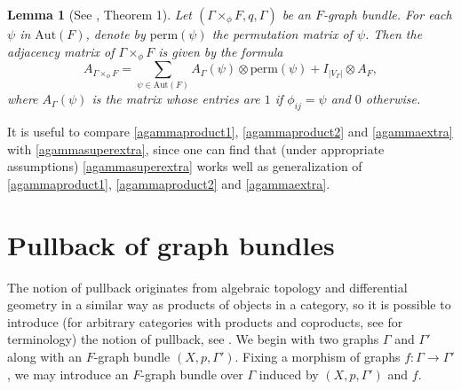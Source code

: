 \documentclass{amsart}
\newtheorem{lem}[theo]{Lemma}
\theoremstyle{definition}
\numberwithin{equation}{section}
\begin{document}
\begin{lem}[See \cite{kwakk}, Theorem 1]\label{th.kwakk}
Let $(\Gamma \times_{\phi} F, q, \Gamma)$ be an $F$-graph bundle. For each $\psi$ in $\mathrm{Aut}(F)$, denote by $\mathrm{perm}(\psi)$ the permutation matrix of $\psi$. Then the adjacency matrix of $\Gamma \times_{\phi} F$ is given by the formula
\begin{equation}\label{agammasuperextra}
A_{\Gamma \times_{\phi} F} = \sum\limits_{\psi \in \mathrm{Aut}(F)} A_{\Gamma}(\psi) \otimes \mathrm{perm}(\psi) + I_{\vert V_{\Gamma} \vert} \otimes A_{F},
\end{equation}
where $A_{\Gamma}(\psi)$ is the matrix whose entries are $1$ if $\phi_{ij}=\psi$ and $0$ otherwise.
\end{lem}


It is useful to compare \eqref{agammaproduct1}, \eqref{agammaproduct2} and \eqref{agammaextra} with  \eqref{agammasuperextra}, since one can find that (under appropriate assumptions) \eqref{agammasuperextra} works well as generalization of
\eqref{agammaproduct1}, \eqref{agammaproduct2} and \eqref{agammaextra}.














\section{Pullback of graph bundles}\label{section3}

The notion of pullback originates from algebraic topology and differential geometry in a similar way as products of objects in a category, so it is possible to introduce (for arbitrary categories with products and coproducts, see \cite[Appendix 3]{hofmor} for terminology) the notion of pullback, see \cite[Definition A3.43]{hofmor}.
We begin with two graphs $\Gamma$ and $\Gamma'$ along with  an $F$-graph bundle  $(X, p, \Gamma')$. Fixing a morphism of graphs $f: \Gamma \longrightarrow \Gamma'$,  we may introduce an $F$-graph bundle over $\Gamma$ induced by $(X, p, \Gamma')$ and $f$. 
\end{document}
